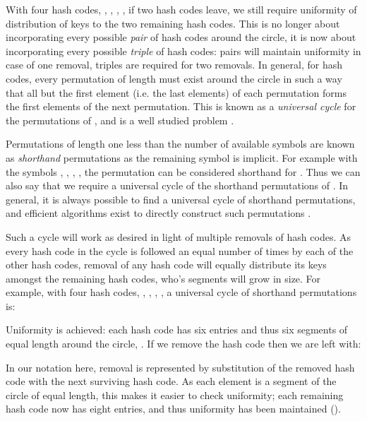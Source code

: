 \documentclass[runningheads,a4paper]{llncs}
\begin{document}
With four hash codes, , , , , if two
hash codes leave, we still require uniformity of distribution of keys
to the two remaining hash codes. This is no longer about incorporating
every possible {\em pair} of hash codes around the circle, it is now
about incorporating every possible {\em triple} of hash codes: pairs
will maintain uniformity in case of one removal, triples are required
for two removals. In general, for  hash codes, every permutation
of length  must exist around the circle in such a way that
all but the first element (i.e. the last  elements) of each
permutation forms the first elements of the next permutation. This is
known as a {\em universal cycle} for the  permutations of
, and is a well studied problem \cite{Jackson1993}.

Permutations of length one less than the number of available symbols
are known as {\em shorthand} permutations as the remaining symbol is
implicit. For example with the symbols , , ,
, the permutation  can be considered
shorthand for . Thus we can also say
that we require a universal cycle of the shorthand permutations of
. In general, it is always possible to find a universal cycle of
shorthand permutations, and efficient algorithms exist to directly
construct such permutations \cite{Ruskey,Holroyd2010}.

Such a cycle will work as desired in light of multiple removals of
hash codes. As every hash code in the cycle is followed an equal
number of times by each of the other hash codes, removal of any hash
code will equally distribute its keys amongst the remaining hash
codes, who's segments will grow in size. For example, with four hash
codes, , , , , a universal cycle of
shorthand permutations is:



\noindent
Uniformity is achieved: each hash code has six entries and thus six
segments of equal length around the circle,
. If we remove the hash code  then
we are left with:



\noindent
In our notation here, removal is represented by substitution of the
removed hash code with the next surviving hash code. As each element
is a segment of the circle of equal length, this makes it easier to
check uniformity; each remaining hash code now has eight entries, and
thus uniformity has been maintained
().
\end{document}
